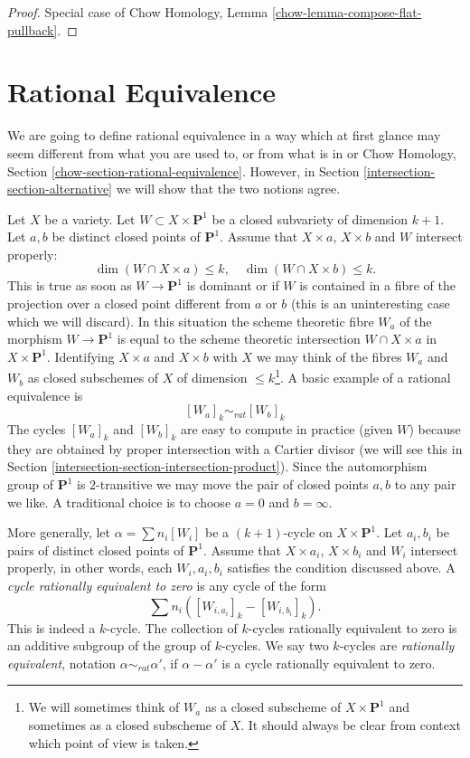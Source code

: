\begin{proof}
Special case of Chow Homology, Lemma \ref{chow-lemma-compose-flat-pullback}.
\end{proof}

\section{Rational Equivalence}
\label{intersection-section-rational-equivalence}
We are going to define rational equivalence in a way which at first
glance may seem different from what you are used to, or from what
is in \cite[Chapter I]{F} or
Chow Homology, Section \ref{chow-section-rational-equivalence}.
However, in Section \ref{intersection-section-alternative} we will show that
the two notions agree.

\medskip\noindent
Let $X$ be a variety. Let $W \subset X \times \mathbf{P}^1$
be a closed subvariety of dimension $k + 1$. Let $a, b$ be distinct closed
points of $\mathbf{P}^1$. Assume that $X \times a$, $X \times b$ and $W$
intersect properly:
$$
\dim (W \cap X \times a) \leq k,\quad
\dim (W \cap X \times b) \leq k.
$$
This is true as soon as $W \to \mathbf{P}^1$ is dominant or if $W$ is
contained in a fibre of the projection over a closed point different from
$a$ or $b$ (this is an uninteresting case which we will discard). In this
situation the scheme theoretic fibre $W_a$ of the morphism
$W \to \mathbf{P}^1$ is equal to the scheme theoretic intersection
$W \cap X \times a$ in $X \times \mathbf{P}^1$. Identifying $X \times a$
and $X \times b$ with $X$ we may think of the fibres $W_a$ and $W_b$
as closed subschemes of $X$ of dimension $\leq k$\footnote{We will sometimes
think of $W_a$ as a closed subscheme of $X \times \mathbf{P}^1$ and sometimes
as a closed subscheme of $X$. It should always be clear from context which
point of view is taken.}. A basic example of a
rational equivalence is
$$
[W_a]_k \sim_{rat} [W_b]_k
$$
The cycles $[W_a]_k$ and $[W_b]_k$ are easy to compute in practice
(given $W$) because they are obtained by proper intersection with
a Cartier divisor (we will see this in
Section \ref{intersection-section-intersection-product}).
Since the automorphism group of $\mathbf{P}^1$ is $2$-transitive we may
move the pair of closed points $a, b$ to any pair we like. A traditional
choice is to choose $a = 0$ and $b = \infty$.

\medskip\noindent
More generally, let $\alpha = \sum n_i [W_i]$ be a $(k + 1)$-cycle on
$X \times \mathbf{P}^1$.  Let $a_i, b_i$ be pairs of distinct closed points of
$\mathbf{P}^1$. Assume that $X \times a_i$, $X \times b_i$ and $W_i$ intersect
properly, in other words, each $W_i, a_i, b_i$ satisfies the condition
discussed above. A {\it cycle rationally equivalent to zero} is any cycle
of the form
$$
\sum n_i([W_{i, a_i}]_k - [W_{i, b_i}]_k).
$$
This is indeed a $k$-cycle. The collection of $k$-cycles rationally
equivalent to zero is an additive subgroup of the group of $k$-cycles.
We say two $k$-cycles are {\it rationally equivalent}, notation
$\alpha \sim_{rat} \alpha'$, if $\alpha - \alpha'$ is a cycle rationally
equivalent to zero.

